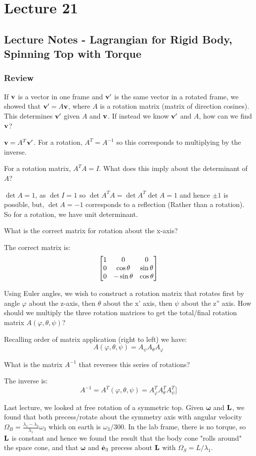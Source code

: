 \section{Lecture 21}
\subsection{Lecture Notes - Lagrangian for Rigid Body, Spinning Top with Torque}
\subsubsection{Review}
If $\mathbf{v}$ is a vector in one frame and $\mathbf{v}'$ is the same vector in a rotated frame, we showed that $\mathbf{v}' = A\mathbf{v}$, where $A$ is a rotation matrix (matrix of direction cosines). This determines $\mathbf{v}'$ given $A$ and $\mathbf{v}$. If instead we know $\mathbf{v}'$ and $A$, how can we find $\mathbf{v}$?
\begin{s}
$\mathbf{v} = A^T\mathbf{v}'$. For a rotation, $A^T = A^{-1}$ so this corresponds to multiplying by the inverse.  
\end{s}
\noindent For a rotation matrix, $A^TA = I$. What does this imply about the determinant of $A$?
\begin{s}
$\det A = 1$, as $\det I = 1$ so $\det A^T A = \det A^T\det A= 1$ and hence $\pm 1$ is possible, but, $\det A = -1$ corresponds to a reflection (Rather than a rotation). So for a rotation, we have unit determinant.
\end{s}
\noindent What is the correct matrix for rotation about the x-axis?
\begin{s}
The correct matrix is:
\[\begin{bmatrix}1 & 0 & 0 \\ 0 & \cos\theta & \sin\theta \\ 0 & -\sin\theta & \cos\theta\end{bmatrix}\]
\end{s}
\noindent Using Euler angles, we wish to construct a rotation matrix that rotates first by angle $\varphi$ about the z-axis, then $\theta$ about the x' axis, then $\psi$ about the z'' axis. How should we multiply the three rotation matrices to get the total/final rotation matrix $A(\varphi ,\theta, \psi)$?
\begin{s}
Recalling order of matrix application (right to left) we have:
\[A(\varphi, \theta, \psi) = A_\psi A_\theta A_{\varphi}\]
\end{s}
What is the matrix $A^{-1}$ that reverses this series of rotations?
\begin{s}
The inverse is:
\[A^{-1} = A^T(\varphi, \theta, \psi) = A_{\varphi}^TA_\theta^TA_\psi^T]\]
\end{s}
Last lecture, we looked at free rotation of a symmetric top. Given $\bm{\omega}$ and $\mathbf{L}$, we found that both precess/rotate about the symmetry axis with angular velocity $\Omega_B = \frac{\lambda_1 - \lambda_3}{\lambda_1}\omega_3$ which on earth is $\omega_3/300$. In the lab frame, there is no torque, so $\mathbf{L}$ is constant and hence we found the result that the body cone "rolls around" the space cone, and that $\bm{\omega}$ and $\hat{\mathbf{e}}_3$ precess about $\mathbf{L}$ with $\Omega_S  = L/\lambda_1$.

